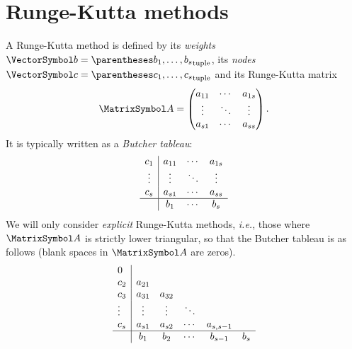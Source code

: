 \documentclass[10pt, a4paper, twoside]{basestyle}
\begin{document}
\section{Runge-Kutta methods}
A Runge-Kutta method is defined by its \emph{weights} $\vb=\tuple{b_1,\dotsc,b_s}$, its \emph{nodes} $\vc=\tuple{c_1,\dotsc,c_s}$ and its Runge-Kutta matrix\[
\matA=
\begin{pmatrix}
a_{11} & \cdots & a_{1s} \\
\vdots & \ddots & \vdots \\
a_{s1} & \cdots & a_{ss}
\end{pmatrix}
\text.
\]
It is typically written as a \emph{Butcher tableau}:\[
\begin{array}{c | c c c c c}
c_1    &  a_{11} &  \cdots &  a_{1s} \\
\vdots &  \vdots &  \ddots &  \vdots \\
c_s    &  a_{s1} &  \cdots &  a_{ss} \\
\hline
       &  b_{1}  &  \cdots &  b_{s}
\end{array}
\]
We will only consider \emph{explicit} Runge-Kutta methods, \emph{i.e.}, those where $\matA$ is strictly lower triangular, so that the Butcher tableau is as follows (blank spaces in $\matA$ are zeros).\[
\begin{array}{l | c c c c c}
0      &        &         &        &           &   \\
c_2    & a_{21} &         &        &           &   \\
c_3    & a_{31} & a_{32}  &        &           &   \\
\vdots & \vdots & \vdots  & \ddots &           &   \\
c_s    & a_{s1} & a_{s2}  & \cdots & a_{s,s-1} &   \\
\hline
       & b_{1}  & b_{2}   & \cdots & b_{s-1}   & b_{s}
\end{array}
\]
\end{document}
